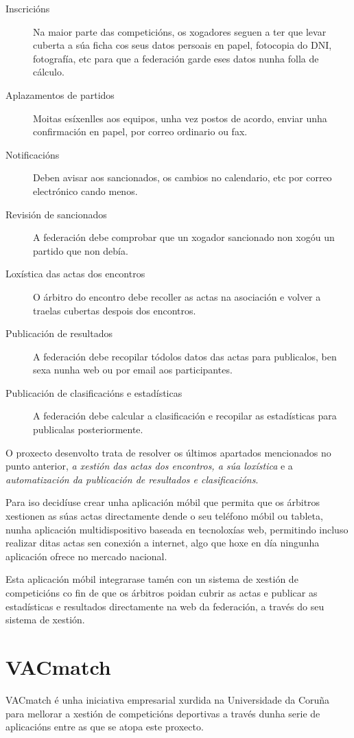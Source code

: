     \begin{description}
     \item [Inscricións] Na maior parte das competicións, os xogadores seguen a ter que 
levar cuberta a súa ficha cos seus datos persoais en papel, fotocopia do DNI, fotografía, 
etc para que a federación garde eses datos nunha folla de cálculo.
     \item [Aplazamentos de partidos] Moitas esíxenlles aos equipos, unha vez postos de 
acordo, enviar unha confirmación en papel, por correo ordinario ou fax.
     \item [Notificacións] Deben avisar aos sancionados, os cambios no calendario, etc 
por correo electrónico cando menos.
     \item [Revisión de sancionados] A federación debe comprobar que un xogador 
sancionado non xogóu un partido que non debía.
     \item [Loxística das actas dos encontros] O árbitro do encontro debe recoller as 
actas na asociación e volver a traelas cubertas despois dos encontros.
     \item [Publicación de resultados] A federación debe recopilar tódolos datos das 
actas para publicalos, ben sexa nunha web ou por email aos participantes.
     \item [Publicación de clasificacións e estadísticas] A federación debe calcular a 
clasificación e recopilar as estadísticas para publicalas posteriormente.
    \end{description}

    O proxecto desenvolto trata de resolver os últimos apartados mencionados no 
punto anterior, \emph{a xestión das actas dos encontros, a súa loxística} e a 
\emph{automatización da publicación de resultados e clasificacións}.


  Para iso decidíuse crear unha aplicación móbil que permita que os árbitros 
xestionen as súas actas directamente dende o seu teléfono móbil ou tableta, 
nunha aplicación multidispositivo baseada en tecnoloxías web, permitindo incluso realizar 
ditas actas sen conexión a internet, algo que hoxe en día ningunha aplicación ofrece no 
mercado nacional.

  Esta aplicación móbil integrarase tamén con un sistema de xestión de 
competicións co fin de que os árbitros poidan cubrir as actas e publicar as 
estadísticas e resultados directamente na web da federación, a través do seu 
sistema de xestión.

    \section{VACmatch}
    VACmatch é unha iniciativa empresarial xurdida na Universidade da Coruña para 
mellorar a xestión de competicións deportivas a través dunha serie de 
aplicacións entre as que se atopa este proxecto.

